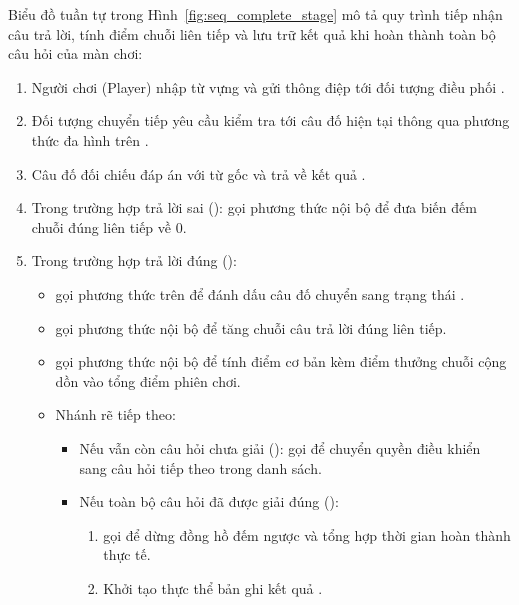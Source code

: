 Biểu đồ tuần tự trong Hình~\ref{fig:seq_complete_stage} mô tả quy trình tiếp nhận câu trả lời, tính điểm chuỗi liên tiếp và lưu trữ kết quả khi hoàn thành toàn bộ câu hỏi của màn chơi:

\begin{enumerate}
    \item Người chơi (Player) nhập từ vựng và gửi thông điệp  tới đối tượng điều phối .
    \item Đối tượng  chuyển tiếp yêu cầu kiểm tra tới câu đố hiện tại thông qua phương thức đa hình  trên .
    \item Câu đố đối chiếu đáp án với từ gốc  và trả về kết quả .
    \item Trong trường hợp trả lời sai ():  gọi phương thức nội bộ  để đưa biến đếm chuỗi đúng liên tiếp về 0.
    \item Trong trường hợp trả lời đúng ():
    \begin{itemize}
        \item {} gọi phương thức  trên  để đánh dấu câu đố chuyển sang trạng thái .
        \item {} gọi phương thức nội bộ  để tăng chuỗi câu trả lời đúng liên tiếp.
        \item {} gọi phương thức nội bộ  để tính điểm cơ bản kèm điểm thưởng chuỗi cộng dồn vào tổng điểm phiên chơi.
        \item Nhánh rẽ tiếp theo:
        \begin{itemize}
            \item Nếu vẫn còn câu hỏi chưa giải ():  gọi  để chuyển quyền điều khiển sang câu hỏi tiếp theo trong danh sách.
            \item Nếu toàn bộ câu hỏi đã được giải đúng ():
            \begin{enumerate}
                \item {} gọi  để dừng đồng hồ đếm ngược và tổng hợp thời gian hoàn thành thực tế.
                \item Khởi tạo thực thể bản ghi kết quả .

\end{enumerate}
\end{itemize}
\end{itemize}
\end{enumerate}
